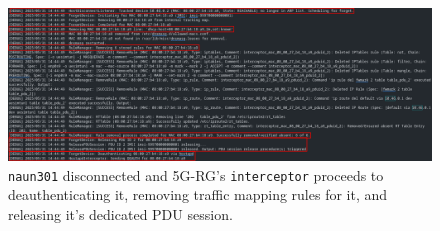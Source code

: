 \begin{figure}
    \centering
    \includegraphics[width=1\linewidth]{figs/naun3_removed.png}
    \caption{\texttt{naun301} disconnected and \acs{5G-RG}'s \texttt{interceptor} proceeds to deauthenticating it, removing traffic mapping rules for it, and releasing it's dedicated \acs{PDU} session.}
    \label{fig:naun3_removed}
\end{figure}

